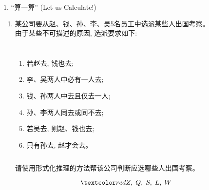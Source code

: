 \begin{frame}{}
  \begin{exampleblock}{$1.$ ``算一算'' (Let us Calculate!)}	
    \begin{enumerate}[(1)]
      \item 某公司要从赵、钱、孙、李、吴5名员工中选派某些人出国考察。\\
	由于某些不可描述的原因, 选派要求如下:

	\begin{columns}
	    \begin{enumerate}[(1)]
	      \item 若赵去, 钱也去;
	      \item 李、吴两人中必有一人去; 
	      \item 钱、孙两人中去且仅去一人; 
	      \item 孙、李两人同去或同不去; 
	      \item 若吴去, 则赵、钱也去;
	      \item 只有孙去, 赵才会去。
	    \end{enumerate}
      \end{columns}

      \vspace{0.20cm}
      请使用形式化推理的方法帮该公司判断应选哪些人出国考察。
    \end{enumerate}
  \end{exampleblock}

  \pause
  \vspace{0.30cm}
  \[
    \red{Z,\; Q,\; S,\; L,\; W}
  \]
\end{frame}

% 

